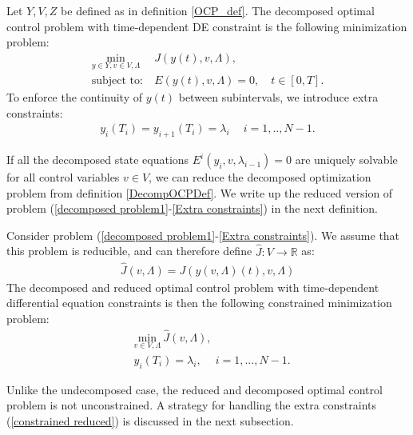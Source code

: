 \begin{definition} \label{DecompOCPDef}
Let $Y,V,Z$ be defined as in definition \ref{OCP_def}. The decomposed optimal control problem with time-dependent DE constraint is the following minimization problem:
\begin{align}
\underset{y\in Y,v\in V,\Lambda}{\text{min}} \ &J(y(t),v,\Lambda),  \label{decomposed problem1}\\
\textrm{subject to:} \ &E(y(t),v,\Lambda)=0, \quad t\in [0,T]. \label{decomposed problem}
\end{align}
To enforce the continuity of $y(t)$ between subintervals, we introduce extra constraints:
 \begin{align}
y_{i}(T_i)=y_{i+1}(T_i)=\lambda_i \quad \ i=1,..,N-1. \label{Extra constraints}
\end{align}
\end{definition}
\noindent
If all the decomposed state equations $E^i(y_i,v,\lambda_{i-1})=0$ are uniquely solvable for all control variables $v\in V$, we can reduce the decomposed optimization problem from definition \ref{DecompOCPDef}. We write up the reduced version of problem (\ref{decomposed problem1}-\ref{Extra constraints}) in the next definition.
\begin{definition} \label{DecompRedOCPDef}
Consider problem (\ref{decomposed problem1}-\ref{Extra constraints}). We assume that this problem is reducible, and can therefore define $\hat J:V\rightarrow\mathbb{R}$ as:
\begin{align*}
\hat J(v,\Lambda) = J(y(v,\Lambda)(t),v,\Lambda)
\end{align*}
The decomposed and reduced optimal control problem with time-dependent differential equation constraints is then the following constrained minimization problem:
\begin{align}
&\underset{v\in V,\Lambda}{\text{min}} \ \hat J(v,\Lambda), \label{constrained reduced j}\\
&y_{i}(T_i)=\lambda_i, \ \quad  i=1,...,N-1. \label{constrained reduced}
\end{align}
\end{definition}
\noindent
Unlike the undecomposed case, the reduced and decomposed optimal control problem is not unconstrained. A strategy for handling the extra constraints (\ref{constrained reduced}) is discussed in the next subsection.
